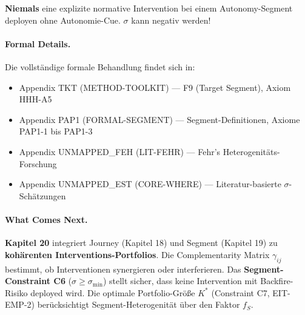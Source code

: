 \begin{tcolorbox}[colback=red!10!white, colframe=red!75!black,
    title=The Golden Rule of Segment Targeting]
\textbf{Niemals} eine explizite normative Intervention bei einem Autonomy-Segment deployen ohne Autonomie-Cue. $\sigma$ kann negativ werden!
\end{tcolorbox}

\paragraph{Formal Details.}
Die vollständige formale Behandlung findet sich in:
\begin{itemize}[nosep]
\item Appendix TKT (METHOD-TOOLKIT) --- F9 (Target Segment), Axiom HHH-A5
\item Appendix PAP1 (FORMAL-SEGMENT) --- Segment-Definitionen, Axiome PAP1-1 bis PAP1-3
\item Appendix UNMAPPED_FEH (LIT-FEHR) --- Fehr's Heterogenitäts-Forschung
\item Appendix UNMAPPED_EST (CORE-WHERE) --- Literatur-basierte $\sigma$-Schätzungen
\end{itemize}

\paragraph{What Comes Next.}
\textbf{Kapitel 20} integriert Journey (Kapitel 18) und Segment (Kapitel 19) zu \textbf{kohärenten Interventions-Portfolios}. Die Complementarity Matrix $\gamma_{ij}$ bestimmt, ob Interventionen synergieren oder interferieren. Das \textbf{Segment-Constraint C6} ($\sigma \geq \sigma_{\min}$) stellt sicher, dass keine Intervention mit Backfire-Risiko deployed wird. Die optimale Portfolio-Größe $K^*$ (Constraint C7, EIT-EMP-2) berücksichtigt Segment-Heterogenität über den Faktor $f_S$.



